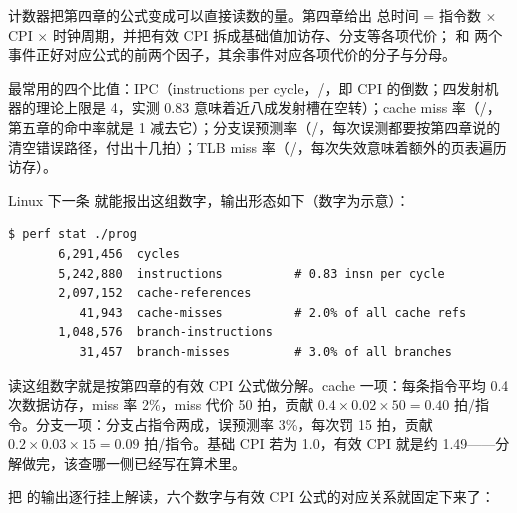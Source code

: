 计数器把第四章的公式变成可以直接读数的量。第四章给出 总时间 = 指令数 $\times$ CPI $\times$ 时钟周期，并把有效 CPI 拆成基础值加访存、分支等各项代价； 和  两个事件正好对应公式的前两个因子，其余事件对应各项代价的分子与分母。

最常用的四个比值：IPC（instructions per cycle，/，即 CPI 的倒数；四发射机器的理论上限是 4，实测 0.83 意味着近八成发射槽在空转）；cache miss 率（/，第五章的命中率就是 1 减去它）；分支误预测率（/，每次误测都要按第四章说的清空错误路径，付出十几拍）；TLB miss 率（/，每次失效意味着额外的页表遍历访存）。

Linux 下一条  就能报出这组数字，输出形态如下（数字为示意）：

\begin{lstlisting}
$ perf stat ./prog
       6,291,456  cycles
       5,242,880  instructions          # 0.83 insn per cycle
       2,097,152  cache-references
          41,943  cache-misses          # 2.0% of all cache refs
       1,048,576  branch-instructions
          31,457  branch-misses         # 3.0% of all branches
\end{lstlisting}

读这组数字就是按第四章的有效 CPI 公式做分解。cache 一项：每条指令平均 0.4 次数据访存，miss 率 2\%，miss 代价 50 拍，贡献 $0.4\times0.02\times50=0.40$ 拍/指令。分支一项：分支占指令两成，误预测率 3\%，每次罚 15 拍，贡献 $0.2\times0.03\times15=0.09$ 拍/指令。基础 CPI 若为 1.0，有效 CPI 就是约 1.49——分解做完，该查哪一侧已经写在算术里。

把  的输出逐行挂上解读，六个数字与有效 CPI 公式的对应关系就固定下来了：

